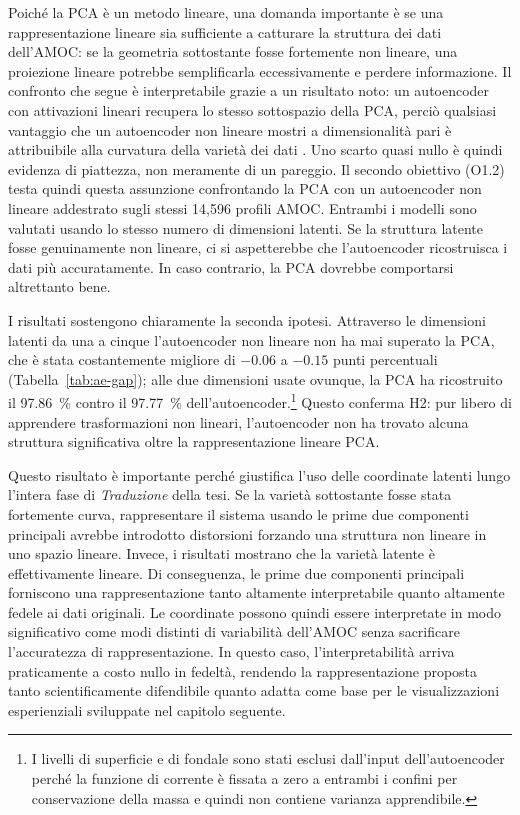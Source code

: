 Poiché la PCA è un metodo lineare, una domanda importante è se una rappresentazione lineare sia sufficiente a catturare la struttura dei dati dell'AMOC: se la geometria sottostante fosse fortemente non lineare, una proiezione lineare potrebbe semplificarla eccessivamente e perdere informazione. Il confronto che segue è interpretabile grazie a un risultato noto: un autoencoder con attivazioni lineari recupera lo stesso sottospazio della PCA, perciò qualsiasi vantaggio che un autoencoder non lineare mostri a dimensionalità pari è attribuibile alla curvatura della varietà dei dati \citep{baldi1989}. Uno scarto quasi nullo è quindi evidenza di piattezza, non meramente di un pareggio. Il secondo obiettivo (O1.2) testa quindi questa assunzione confrontando la PCA con un autoencoder non lineare addestrato sugli stessi 14{,}596 profili AMOC. Entrambi i modelli sono valutati usando lo stesso numero di dimensioni latenti. Se la struttura latente fosse genuinamente non lineare, ci si aspetterebbe che l'autoencoder ricostruisca i dati più accuratamente. In caso contrario, la PCA dovrebbe comportarsi altrettanto bene.

I risultati sostengono chiaramente la seconda ipotesi. Attraverso le dimensioni latenti da una a cinque l'autoencoder non lineare non ha mai superato la PCA, che è stata costantemente migliore di $-0.06$ a $-0.15$ punti percentuali (Tabella~\ref{tab:ae-gap}); alle due dimensioni usate ovunque, la PCA ha ricostruito il \SI{97.86}{\percent} contro il \SI{97.77}{\percent} dell'autoencoder.\footnote{I livelli di superficie e di fondale sono stati esclusi dall'input dell'autoencoder perché la funzione di corrente è fissata a zero a entrambi i confini per conservazione della massa e quindi non contiene varianza apprendibile.} Questo conferma H2: pur libero di apprendere trasformazioni non lineari, l'autoencoder non ha trovato alcuna struttura significativa oltre la rappresentazione lineare PCA.




Questo risultato è importante perché giustifica l'uso delle coordinate latenti lungo l'intera fase di \emph{Traduzione} della tesi. Se la varietà sottostante fosse stata fortemente curva, rappresentare il sistema usando le prime due componenti principali avrebbe introdotto distorsioni forzando una struttura non lineare in uno spazio lineare. Invece, i risultati mostrano che la varietà latente è effettivamente lineare. Di conseguenza, le prime due componenti principali forniscono una rappresentazione tanto altamente interpretabile quanto altamente fedele ai dati originali. Le coordinate possono quindi essere interpretate in modo significativo come modi distinti di variabilità dell'AMOC senza sacrificare l'accuratezza di rappresentazione. In questo caso, l'interpretabilità arriva praticamente a costo nullo in fedeltà, rendendo la rappresentazione proposta tanto scientificamente difendibile quanto adatta come base per le visualizzazioni esperienziali sviluppate nel capitolo seguente.

